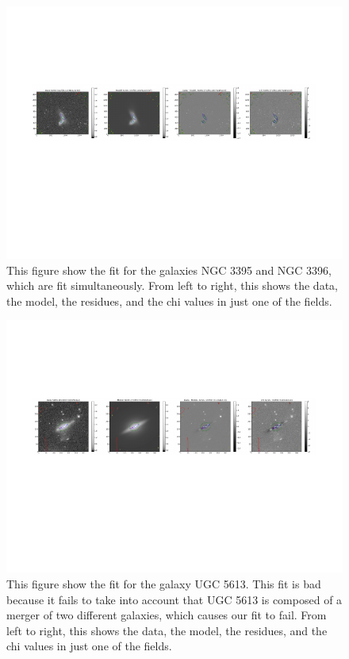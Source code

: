 \documentclass[12pt,preprint,pdftex]{aastex}
\begin{document}
\begin{figure}
\centering
\includegraphics[trim = .9cm 4.5cm 1.15cm 2.9cm,clip=true,width=\textwidth] {gooddouble.pdf}
\caption{This figure show the fit for the galaxies NGC 3395 and NGC 3396, which are fit simultaneously. From left to right, this shows the data, the model, the residues, and the chi values in just one of the fields.}
\label{fig:gooddouble}
\end{figure}
\begin{figure}
\centering
\includegraphics[trim = .9cm 4.5cm 1.15cm 2.9cm,clip=true,width=\textwidth] {badsingle.pdf}
\caption{This figure show the fit for the galaxy UGC 5613. This fit is bad because it fails to take into account that UGC 5613 is composed of a merger of two different galaxies, which causes our fit to fail. From left to right, this shows the data, the model, the residues, and the chi values in just one of the fields.}
\label{fig:badsingle}
\end{figure}
\end{document}
